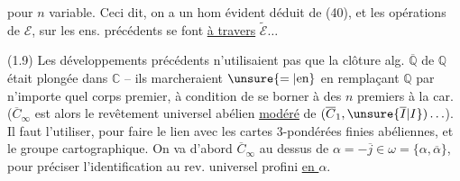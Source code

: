 pour $n$ variable. Ceci dit, on a un hom évident
\diagram{\[
(41)\qquad\begin{tikzcd}[ampersand replacement=\&,column sep=huge]
\mathcal E=(\unsure{\mathfrak S_3|\mathbb G_3}\times\Gamma)
\mathbin{\underset{\scriptscriptstyle1/2}{.}}\pi_\infty\arrow[r]\&
\widetilde{\mathcal E}=(\unsure{\mathfrak S_3|\mathbb G_3}\times A)
\mathbin{\underset{\scriptscriptstyle1/2}{.}}\pi_\infty
\end{tikzcd}
\]}
déduit de (40), et les opérations de $\mathcal E$, sur les ens. précédents
se font \uline{à travers} $\widetilde{\mathcal E}\ldots$

(1.9) Les développements précédents n'utilisaient pas que la clôture alg.
 $\overline{\mathbb Q}$ de $\mathbb Q$ était plongée dans
$\mathbb C$ -- ils marcheraient $\unsure{=|\text{en}}$ en remplaçant
$\mathbb Q$ par n'importe quel corps premier, à condition de se borner à des
$n$ premiers à la car. ($\overline C_\infty$ est alors le revêtement universel
abélien \uline{modéré} de $(\overline C_1,\unsure{\overline I|I})\ldots$).
Il faut l'utiliser, pour faire le lien avec les cartes 3-pondérées finies
abéliennes, et le groupe cartographique. On va d'abord 
$\overline C_\infty$ au dessus de
$\alpha=-\overline j\in\omega=\{\alpha,\overline\alpha\}$, pour préciser
l'identification au rev. universel profini  \uline{en $\alpha$}.
